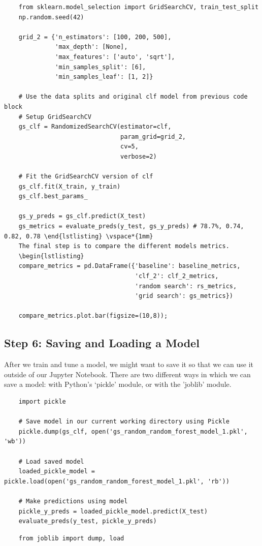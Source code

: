 \documentclass[11pt, a4paper]{article}
\begin{document}
\begin{spacing}{1.1}
	\begin{lstlisting}
	from sklearn.model_selection import GridSearchCV, train_test_split
	np.random.seed(42)
	
	grid_2 = {'n_estimators': [100, 200, 500],
	          'max_depth': [None],
	          'max_features': ['auto', 'sqrt'],
	          'min_samples_split': [6],
	          'min_samples_leaf': [1, 2]}
	
	# Use the data splits and original clf model from previous code block
	# Setup GridSearchCV
	gs_clf = RandomizedSearchCV(estimator=clf, 
	                            param_grid=grid_2, 
	                            cv=5,
	                            verbose=2)	
	
	# Fit the GridSearchCV version of clf
	gs_clf.fit(X_train, y_train)
	gs_clf.best_params_
	
	gs_y_preds = gs_clf.predict(X_test)
	gs_metrics = evaluate_preds(y_test, gs_y_preds) # 78.7%, 0.74, 0.82, 0.78 \end{lstlisting} \vspace*{1mm}
	The final step is to compare the different models metrics.
	\begin{lstlisting}
	compare_metrics = pd.DataFrame({'baseline': baseline_metrics,
	                                'clf_2': clf_2_metrics,
	                                'random search': rs_metrics,
	                                'grid search': gs_metrics}) 
	                                
	compare_metrics.plot.bar(figsize=(10,8)); \end{lstlisting} \vspace*{1mm}
	\subsection{Step 6: Saving and Loading a Model}
	After we train and tune a model, we might want to save it so that we can use it outside of our Jupyter Notebook. There are two different ways in which we can save a model: with Python's `pickle' module, or with the 'joblib' module. 
	\begin{lstlisting}
	import pickle
	
	# Save model in our current working directory using Pickle
	pickle.dump(gs_clf, open('gs_random_random_forest_model_1.pkl', 'wb')) 
	
	# Load saved model
	loaded_pickle_model = pickle.load(open('gs_random_random_forest_model_1.pkl', 'rb'))
	
	# Make predictions using model
	pickle_y_preds = loaded_pickle_model.predict(X_test)
	evaluate_preds(y_test, pickle_y_preds)	\end{lstlisting} \vspace*{1mm}
	\begin{lstlisting}
	from joblib import dump, load
	

\end{lstlisting}
\end{spacing}
\end{document}
